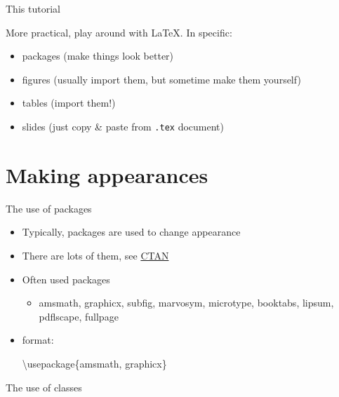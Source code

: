 \documentclass[ignorenonframetext,]{beamer}
\newenvironment{Shaded}{\begin{snugshade}}{\end{snugshade}}
\newcommand{\NormalTok}[1]{{#1}}
\begin{document}
\begin{frame}{This tutorial}

More practical, play around with \LaTeX. In specific:

\begin{itemize}
\itemsep1pt\parskip0pt
\item
  packages (make things look better)
\item
  figures (usually import them, but sometime make them yourself)
\item
  tables (import them!)
\item
  slides (just copy \& paste from \texttt{.tex} document)
\end{itemize}

\end{frame}

\section{Making appearances}\label{making-appearances}

\begin{frame}[fragile]{The use of packages}

\begin{itemize}
\item
  Typically, packages are used to change appearance
\item
  There are lots of them, see \href{http://www.ctan.org}{CTAN}
\item
  Often used packages

  \begin{itemize}
  \itemsep1pt\parskip0pt
  \item
    amsmath, graphicx, subfig, marvosym, microtype, booktabs, lipsum,
    pdflscape, fullpage
  \end{itemize}
\item
  format:

\begin{Shaded}
\begin{Highlighting}[]
\NormalTok{\textbackslash{}usepackage\{amsmath, graphicx\}}
\end{Highlighting}
\end{Shaded}
\end{itemize}

\end{frame}

\begin{frame}{The use of classes}

\end{frame}
\end{document}
